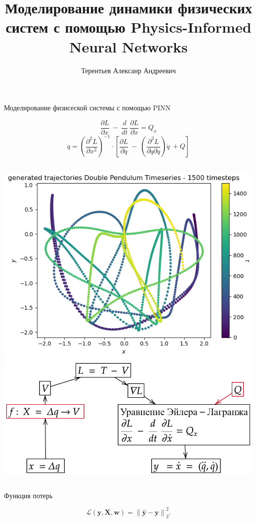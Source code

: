 \documentclass{beamer}
\title[\hbox to 56mm{Порождение признаков}]{Моделирование динамики физических систем с помощью Physics-Informed Neural Networks}
\author{Терентьев Алексанр Андреевич}
\institute{Московский физико-технический институт}
\date{\footnotesize
\par\bigskip\small 2023}
\begin{document}
\begin{frame}
\thispagestyle{empty}
\maketitle
\end{frame}
\begin{frame}{Моделирование физисеской системы с помощью PINN}


$$ \frac{\partial L}{\partial x} \ -\ \frac{d}{dt} \ \frac{\partial L}{\partial \dot{x}} =Q_{x} $$
$$ \ddot{q} =\left(\frac{\partial ^{2} L}{\partial x^{2}}\right)^{-1} \cdot \left[\frac{\partial L}{\partial q} \ -\ \left(\frac{\partial ^{2} L}{\partial \dot{q} \partial q}\right)\dot{q} \ +Q\right] $$

\begin{columns}[c]
\includegraphics[width=1.0\textwidth]{trajectory.png}
\includegraphics[width=1.0\textwidth]{Scheme.png}
\end{columns}

\bigskip
Функция потерь

$$\mathcal{L}(\mathbf{y}, \mathbf{X}, \mathbf{w}) =\left\lVert \hat{\mathbf{y}} - \mathbf{y} \right\rVert^{2}_2.$$
\end{frame}

\end{document}
